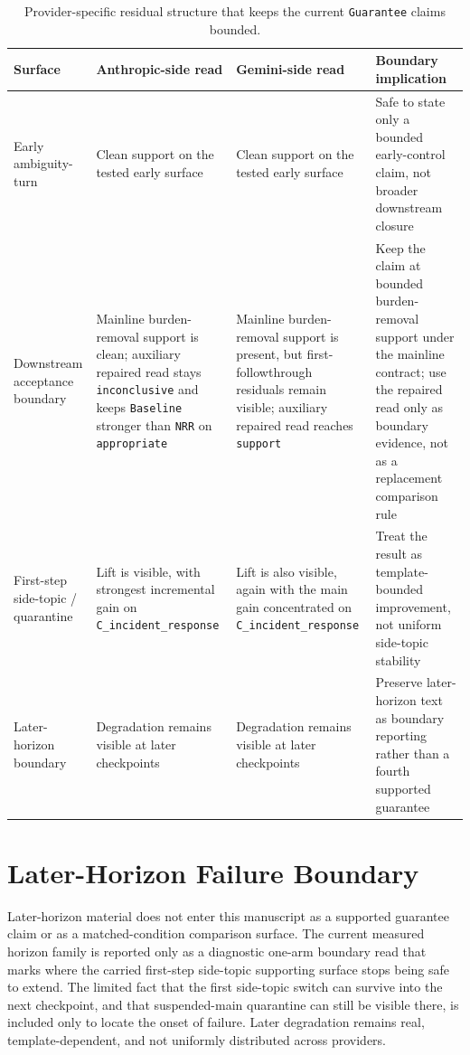 \documentclass[11pt]{article}
\begin{document}
\begin{table}[ht]
\centering
\begin{tabular}{|p{}|p{}|p{}|p{}|}
\hline
\textbf{Surface} & \textbf{Anthropic-side read} & \textbf{Gemini-side read} & \textbf{Boundary implication} \\
\hline
Early ambiguity-turn & Clean support on the tested early surface & Clean support on the tested early surface & Safe to state only a bounded early-control claim, not broader downstream closure \\
\hline
Downstream acceptance boundary & Mainline burden-removal support is clean; auxiliary repaired read stays \texttt{inconclusive} and keeps \texttt{Baseline} stronger than \texttt{NRR} on \texttt{appropriate} & Mainline burden-removal support is present, but first-followthrough residuals remain visible; auxiliary repaired read reaches \texttt{support} & Keep the claim at bounded burden-removal support under the mainline contract; use the repaired read only as boundary evidence, not as a replacement comparison rule \\
\hline
First-step side-topic / quarantine & Lift is visible, with strongest incremental gain on \texttt{C\_incident\_response} & Lift is also visible, again with the main gain concentrated on \texttt{C\_incident\_response} & Treat the result as template-bounded improvement, not uniform side-topic stability \\
\hline
Later-horizon boundary & Degradation remains visible at later checkpoints & Degradation remains visible at later checkpoints & Preserve later-horizon text as boundary reporting rather than a fourth supported guarantee \\
\hline
\end{tabular}
\caption{Provider-specific residual structure that keeps the current
\texttt{Guarantee} claims bounded.}
\end{table}

\section{Later-Horizon Failure Boundary}

Later-horizon material does not enter this manuscript as a supported guarantee
claim or as a matched-condition comparison surface. The current measured horizon
family is reported only as a diagnostic one-arm boundary read that marks where
the carried first-step side-topic supporting surface stops being safe to
extend.
The limited fact that the first side-topic switch can survive into the next
checkpoint, and that suspended-main quarantine can still be visible there, is
included only to locate the onset of failure. Later degradation remains real,
template-dependent, and not uniformly distributed across providers.
\end{document}
